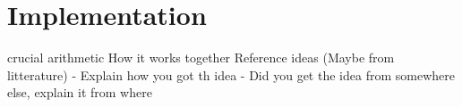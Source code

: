 \section{Implementation}
    crucial arithmetic
    How it works together
    Reference ideas (Maybe from litterature)
    - Explain how you got th idea
    - Did you get the idea from somewhere else, explain it from where